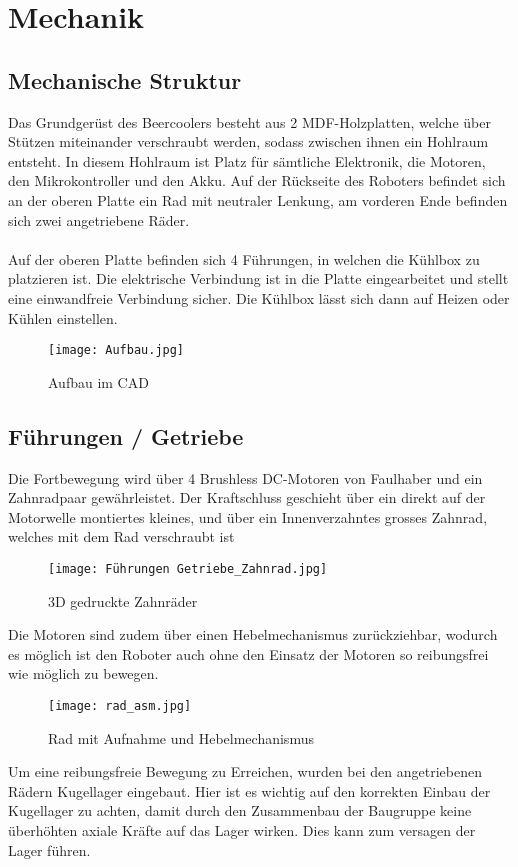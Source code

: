 \section{Mechanik}

\subsection{Mechanische Struktur}
Das Grundgerüst des Beercoolers besteht aus 2 MDF-Holzplatten, welche über Stützen miteinander verschraubt werden, sodass zwischen ihnen ein Hohlraum entsteht. In diesem Hohlraum ist Platz für sämtliche Elektronik, die Motoren, den Mikrokontroller und den Akku. Auf der Rückseite des Roboters befindet sich an der oberen Platte ein Rad mit neutraler Lenkung, am vorderen Ende befinden sich zwei angetriebene Räder.\\
\\
Auf der oberen Platte befinden sich 4 Führungen, in welchen die Kühlbox zu platzieren ist. Die elektrische Verbindung ist in die Platte eingearbeitet und stellt eine einwandfreie Verbindung sicher. Die Kühlbox lässt sich dann auf Heizen oder Kühlen einstellen.

\begin{figure}[H]
    \begin{center}
    \texttt{[image: Aufbau.jpg]}
    \end{center}
    \caption{Aufbau im CAD}
\end{figure}

\subsection{Führungen / Getriebe}
Die Fortbewegung wird über 4 Brushless DC-Motoren von Faulhaber und ein Zahnradpaar gewährleistet. Der Kraftschluss geschieht über ein direkt auf der Motorwelle montiertes kleines, und über ein Innenverzahntes grosses Zahnrad, welches mit dem Rad verschraubt ist\\

\begin{figure}[H]
    \begin{center}
    \texttt{[image: Führungen Getriebe\_Zahnrad.jpg]}
    \end{center}
    \caption{3D gedruckte Zahnräder}
\end{figure}

Die Motoren sind zudem über einen Hebelmechanismus zurückziehbar, wodurch es möglich ist den Roboter auch ohne den Einsatz der Motoren so reibungsfrei wie möglich zu bewegen. 

\begin{figure}[H]
    \begin{center}
    \texttt{[image: rad\_asm.jpg]}
    \end{center}
    \caption{Rad mit Aufnahme und Hebelmechanismus}
\end{figure}

Um eine reibungsfreie Bewegung zu Erreichen, wurden bei den angetriebenen Rädern Kugellager eingebaut. Hier ist es wichtig auf den korrekten Einbau der Kugellager zu achten, damit durch den Zusammenbau der Baugruppe keine überhöhten axiale Kräfte auf das Lager wirken. Dies kann zum versagen der Lager führen.
